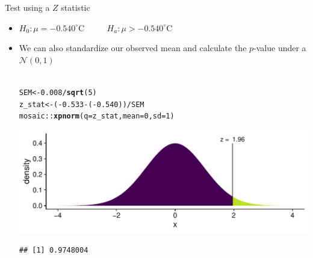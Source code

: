 \documentclass[10pt,handout]{beamer}\usepackage[]{graphicx}\usepackage[]{color}
\makeatletter
\def\maxwidth{ %
  \ifdim\Gin@nat@width>\linewidth
    \linewidth
  \else
    \Gin@nat@width
  \fi
}
\newcommand{\hlnum}[1]{\textcolor[rgb]{0.686,0.059,0.569}{#1}}%
\newcommand{\hlopt}[1]{\textcolor[rgb]{0,0,0}{#1}}%
\newcommand{\hlstd}[1]{\textcolor[rgb]{0.345,0.345,0.345}{#1}}%
\newcommand{\hlkwb}[1]{\textcolor[rgb]{0.69,0.353,0.396}{#1}}%
\newcommand{\hlkwc}[1]{\textcolor[rgb]{0.333,0.667,0.333}{#1}}%
\newcommand{\hlkwd}[1]{\textcolor[rgb]{0.737,0.353,0.396}{\textbf{#1}}}%
\newenvironment{kframe}{%
 \def\at@end@of@kframe{}%
 \ifinner\ifhmode%
  \def\at@end@of@kframe{\end{minipage}}%
  \begin{minipage}{\columnwidth}%
 \fi\fi%
 \def\FrameCommand##1{\hskip\@totalleftmargin \hskip-\fboxsep
 \colorbox{shadecolor}{##1}\hskip-\fboxsep
     \hskip-\linewidth \hskip-\@totalleftmargin \hskip\columnwidth}%
 \MakeFramed {\advance\hsize-\width
   \@totalleftmargin\z@ \linewidth\hsize
   \@setminipage}}%
 {\par\unskip\endMakeFramed%
 \at@end@of@kframe}
\newenvironment{knitrout}{}{} %
\makeatother
\begin{document}
\begin{frame}[fragile]{Test using a $Z$ statistic}
	\begin{itemize}
		\setlength\itemsep{.7em}
		\item   $H_0: \mu =  -0.540^{\circ}$C $\qquad$  $H_a: \mu >  -0.540^{\circ}$C
		
		\item We can also standardize our observed mean and calculate the $p$-value under a $\mathcal{N}(0,1)$ \\ \ \\
		
\begin{knitrout}\tiny
{}\color{fgcolor}\begin{kframe}
\begin{alltt}
\hlstd{SEM} \hlkwb{<-} \hlnum{0.008}\hlopt{/}\hlkwd{sqrt}\hlstd{(}\hlnum{5}\hlstd{)}
\hlstd{z_stat} \hlkwb{<-} \hlstd{(}\hlopt{-}\hlnum{0.533} \hlopt{-} \hlstd{(}\hlopt{-}\hlnum{0.540}\hlstd{))} \hlopt{/} \hlstd{SEM}
\hlstd{mosaic}\hlopt{::}\hlkwd{xpnorm}\hlstd{(}\hlkwc{q} \hlstd{= z_stat,} \hlkwc{mean} \hlstd{=} \hlnum{0}\hlstd{,} \hlkwc{sd} \hlstd{=} \hlnum{1}\hlstd{)}
\end{alltt}


{\ttfamily\noindent\itshape\color{messagecolor}{\#\# }}

{\ttfamily\noindent\itshape{}}

{\ttfamily\noindent\itshape\color{messagecolor}{\#\# 	P(X <= 1.957) = P(Z <= 1.957) = 0.9748}}

{\ttfamily\noindent\itshape\color{messagecolor}{\#\# 	P(X > \ 1.957) = P(Z > \ 1.957) = 0.0252}}

{\ttfamily\noindent\itshape\color{messagecolor}{\#\# }}\end{kframe}

{\centering \includegraphics[width=\maxwidth]{figure/unnamed-chunk-3-1} 

}


\begin{kframe}\begin{verbatim}
## [1] 0.9748004
\end{verbatim}
\end{kframe}
\end{knitrout}
		
	\end{itemize}
\end{frame}
\end{document}
